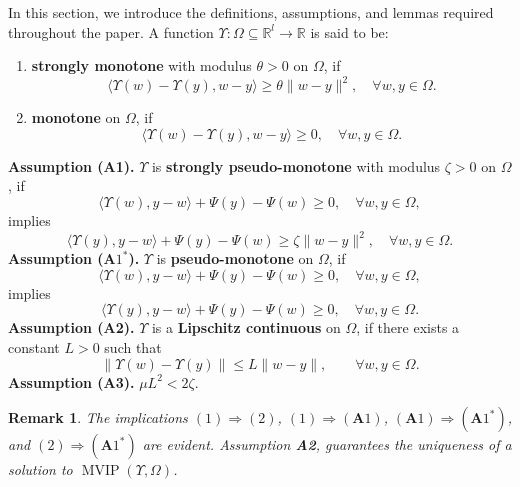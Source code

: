\documentclass{article}
\theoremstyle{plain}%
\newtheorem{remark}{Remark}%
\theoremstyle{thmstyletwo}%
\theoremstyle{thmstylethree}%
\begin{document}
\noindent
In this section, we introduce the definitions, assumptions, and lemmas required throughout the paper.
A function $\Upsilon : \Omega\subseteq
\mathbb{R}^l \to \mathbb{R}$ is said to be:
\begin{enumerate}
    \item \textbf{strongly monotone} with modulus \(\theta > 0\) on $\Omega$, if
    \[
    \langle \Upsilon(w) - \Upsilon(y), w - y \rangle
\ge\theta \|w - y\|^2,
\quad \forall w, y \in \Omega.
    \]
\item \textbf{monotone} on $\Omega$, if
    \[
        \langle \Upsilon(w)-\Upsilon(y), w - y \rangle
\ge 0,
        \quad \forall w, y \in \Omega.
    \]
\end{enumerate}  
   \textbf{Assumption (A1).} $\Upsilon$ is \textbf{strongly pseudo-monotone} with modulus \(\zeta > 0\) on $\Omega$, if  
    \[ \langle \Upsilon(w), y - w \rangle+ \Psi(y) - \Psi(w) \ge 0,
        \quad \forall w, y \in \Omega,
    \]
        implies
        \[
\langle \Upsilon(y), y - w \rangle+ \Psi(y) - \Psi(w)
\ge \zeta \|w - y\|^2,
\quad \forall w, y \in \Omega .
    \]
    \textbf{Assumption (A$1^*$).} $\Upsilon$ is \textbf{pseudo-monotone} on $\Omega$, if
     \[ \langle \Upsilon(w), y - w \rangle+ \Psi(y) - \Psi(w) \ge 0,
        \quad \forall w, y \in \Omega,
    \]
        implies
        \[
\langle \Upsilon(y), y - w \rangle+ \Psi(y) - \Psi(w)
\ge 0,
\quad \forall w, y \in \Omega .
    \]
    \textbf{Assumption (A2).} $\Upsilon$ is a \textbf{Lipschitz continuous} on $\Omega$, if there exists a constant \(L > 0\) such that  
\[
\|\Upsilon(w) - \Upsilon(y)\|
\le L \|w - y\|, \qquad \forall w,y \in \Omega.
\]
\textbf{Assumption (A3).} \(\mu L^{2} < 2\zeta\).\\
\begin{remark} The implications \((1) \Rightarrow (2)\), \((1) \Rightarrow (\textbf{A} 1)\), \((\textbf{A}  1) \Rightarrow (\textbf{A}  1^*)\), and 
\((2) \Rightarrow (\textbf{A} 1^*)\) are evident. Assumption \textbf{A2}, guarantees the uniqueness of a solution to $\operatorname{MVIP}(\Upsilon,\Omega)$.\\
\end{remark}
\end{document}
